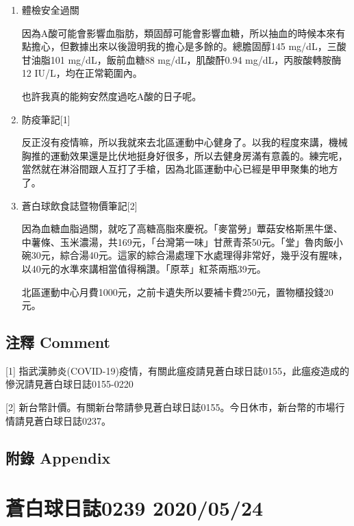 \documentclass[a5paper, 12pt
]{book}
\begin{document}
\begin{enumerate}
\def\labelenumi{\arabic{enumi}.}
\item
  體檢安全過關

  因為A酸可能會影響血脂肪，類固醇可能會影響血糖，所以抽血的時候本來有點擔心，但數據出來以後證明我的擔心是多餘的。總膽固醇145
  mg/dL，三酸甘油脂101 mg/dL，飯前血糖88 mg/dL，肌酸酐0.94
  mg/dL，丙胺酸轉胺酶12 IU/L，均在正常範圍內。

  也許我真的能夠安然度過吃A酸的日子呢。
\item
  防疫筆記{[}1{]}

  反正沒有疫情嘛，所以我就來去北區運動中心健身了。以我的程度來講，機械胸推的運動效果還是比伏地挺身好很多，所以去健身房滿有意義的。練完呢，當然就在淋浴間跟人互打了手槍，因為北區運動中心已經是甲甲聚集的地方了。
\item
  蒼白球飲食誌暨物價筆記{[}2{]}

  因為血糖血脂過關，就吃了高糖高脂來慶祝。「麥當勞」蕈菇安格斯黑牛堡、中薯條、玉米濃湯，共169元，「台灣第一味」甘蔗青茶50元。「堂」魯肉飯小碗30元，綜合湯40元。這家的綜合湯處理下水處理得非常好，幾乎沒有腥味，以40元的水準來講相當值得稱讚。「原萃」紅茶兩瓶39元。

  北區運動中心月費1000元，之前卡遺失所以要補卡費250元，置物櫃投錢20元。
\end{enumerate}

\hypertarget{ux6ce8ux91cb-comment-83}{%
\subsection{注釋 Comment}\label{ux6ce8ux91cb-comment-83}}

{[}1{]}
指武漢肺炎(COVID-19)疫情，有關此瘟疫請見蒼白球日誌0155，此瘟疫造成的慘況請見蒼白球日誌0155-0220

{[}2{]}
新台幣計價。有關新台幣請參見蒼白球日誌0155。今日休市，新台幣的市場行情請見蒼白球日誌0237。

\hypertarget{ux9644ux9304-appendix-83}{%
\subsection{附錄 Appendix}\label{ux9644ux9304-appendix-83}}

\hypertarget{ux84bcux767dux7403ux65e5ux8a8c0239-20200524}{%
\section{蒼白球日誌0239
2020/05/24}\label{ux84bcux767dux7403ux65e5ux8a8c0239-20200524}}
\end{document}

